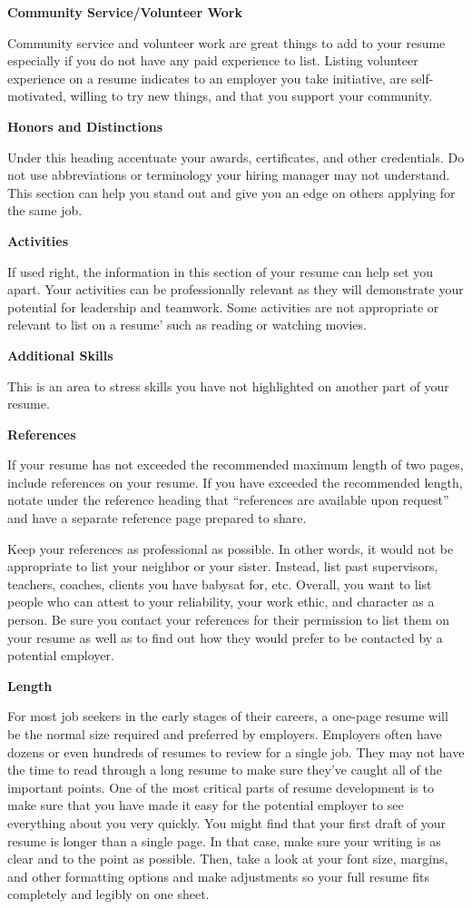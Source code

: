 \textbf{Community Service/Volunteer Work}

Community service and volunteer work are great things to add to your resume especially if you do not have any paid experience to list. Listing volunteer experience on a resume indicates to an employer you take initiative, are self-motivated, willing to try new things, and that you support your community.

\textbf{Honors and Distinctions}

Under this heading accentuate your awards, certificates, and other credentials. Do not use abbreviations or terminology your hiring manager may not understand. This section can help you stand out and give you an edge on others applying for the same job.

\textbf{Activities}

If used right, the information in this section of your resume can help set you apart. Your activities can be professionally relevant as they will demonstrate your potential for leadership and teamwork. Some activities are not appropriate or relevant to list on a resume' such as reading or watching movies.
 
\textbf{Additional Skills}

This is an area to stress skills you have not highlighted on another part of your resume.

\textbf{References}

If your resume has not exceeded the recommended maximum length of two pages, include references on your resume. If you have exceeded the recommended length, notate under the reference heading that ``references are available upon request'' and have a separate reference page prepared to share.

Keep your references as professional as possible. In other words, it would not be appropriate to list your neighbor or your sister. Instead, list past supervisors, teachers, coaches, clients you have babysat for, etc. Overall, you want to list people who can attest to your reliability, your work ethic, and character as a person. Be sure you contact your references for their permission to list them on your resume as well as to find out how they would prefer to be contacted by a potential employer.

\textbf{Length}

For most job seekers in the early stages of their careers, a one-page resume will be the normal size required and preferred by employers. Employers often have dozens or even hundreds of resumes to review for a single job. They may not have the time to read through a long resume to make sure they've caught all of the important points.
One of the most critical parts of resume development is to make sure that you have made it easy for the potential employer to see everything about you very quickly. You might find that your first draft of your resume is longer than a single page. In that case, make sure your writing is as clear and to the point as possible. Then, take a look at your font size, margins, and other formatting options and make adjustments so your full resume fits completely and legibly on one sheet.

